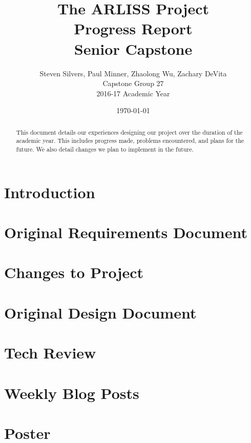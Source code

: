 \documentclass[10pt,letterpaper,onecolumn,draftclsnofoot,journal]{IEEEtran}
\begin{document}
\begin{titlepage}
	\title{The ARLISS Project\\Progress Report\\Senior Capstone}
	\author{Steven Silvers, Paul Minner, Zhaolong Wu, Zachary DeVita\\
		Capstone Group 27\\2016-17 Academic Year}
	\date{\today}
	\maketitle
	\vspace{4cm}
	\begin{abstract}
		\noindent This document details our experiences designing our project over the duration of the academic year. This includes progress made, problems encountered, and plans for the future. We also detail changes we plan to implement in the future.
	\end{abstract}

\end{titlepage}
\tableofcontents
\clearpage

\section{Introduction}
\section{Original Requirements Document}

\section{Changes to Project}
\section{Original Design Document}

\section{Tech Review}

\section{Weekly Blog Posts}
\section{Poster}

\end{document}
